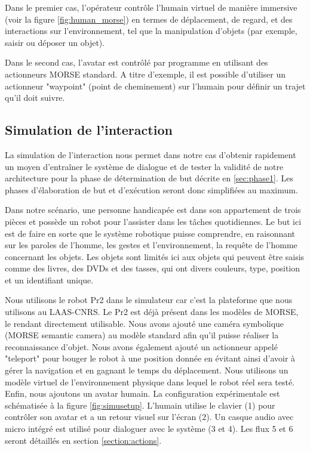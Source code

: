 \documentclass[a4paper,11pt,twoside]{StyleThese}
\begin{document}
Dans le premier cas, l'opérateur contrôle l'humain virtuel de manière immersive (voir la figure \ref{fig:human_morse}) en termes de déplacement, de regard, et des interactions sur l'environnement, tel que la manipulation d'objets (par exemple, saisir ou déposer un objet).

Dans le second cas, l'avatar est contrôlé par programme en utilisant des actionneurs MORSE standard. A titre d'exemple, il est possible d'utiliser un actionneur "waypoint" (point de cheminement) sur l'humain pour définir un trajet qu'il doit suivre.


\subsection{Simulation de l'interaction}

La simulation de l'interaction nous permet dans notre cas d'obtenir rapidement un moyen d'entraîner le système de dialogue et de tester la validité de notre architecture pour la phase de détermination de but décrite en \ref{sec:phase1}.
Les phases d'élaboration de but et d'exécution seront donc simplifiées au maximum.

Dans notre scénario, une personne handicapée est dans son appartement de trois pièces et possède un robot pour l'assister dans les tâches quotidiennes.
Le but ici est de faire en sorte que le système robotique puisse comprendre, en raisonnant sur les paroles de l'homme, les gestes et l'environnement, la requête de l'homme concernant les objets. Les objets sont limités ici aux objets qui peuvent être saisis comme des livres, des DVDs et des tasses, qui ont divers couleurs, type, position et un identifiant unique.

Nous utilisons le robot Pr2 dans le simulateur car c'est la plateforme que nous utilisons au LAAS-CNRS. Le Pr2 est déjà présent dans les modèles de MORSE, le rendant directement utilisable. Nous avons ajouté une caméra symbolique (MORSE semantic camera) au modèle standard afin qu'il puisse réaliser la reconnaissance d'objet. Nous avons également ajouté un actionneur appelé "teleport" pour bouger le robot à une position donnée en évitant ainsi d'avoir à gérer la navigation et en gagnant le temps du déplacement. Nous utilisons un modèle virtuel de l'environnement physique dans lequel le robot réel sera testé. Enfin, nous ajoutons un avatar humain. La configuration expérimentale est schématisée à la figure \ref{fig:simusetup}. L'humain utilise le clavier (1) pour contrôler son avatar et a un retour visuel sur l'écran (2). Un casque audio avec micro intégré est utilisé pour dialoguer avec le système (3 et 4). Les flux 5 et 6 seront détaillés en section \ref{section:actions}. 
\end{document}
